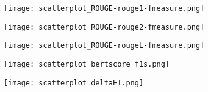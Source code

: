 \documentclass[11pt]{article}
\begin{document}
\begin{center}
  \texttt{[image: scatterplot\_ROUGE-rouge1-fmeasure.png]}
  \label{fig:pair-rouge1}
\end{center}
\begin{center}
  \texttt{[image: scatterplot\_ROUGE-rouge2-fmeasure.png]}
  \label{fig:pair-rouge2}
\end{center}
\begin{center}
  \texttt{[image: scatterplot\_ROUGE-rougeL-fmeasure.png]}
  \label{fig:pair-rougeL}
\end{center}
\begin{center}
  \texttt{[image: scatterplot\_bertscore\_f1s.png]}
  \label{fig:pair-bertscore}
\end{center}
\begin{center}
  \texttt{[image: scatterplot\_deltaEI.png]}
  \label{fig:pair-deltaEI}
\end{center}
\end{document}
